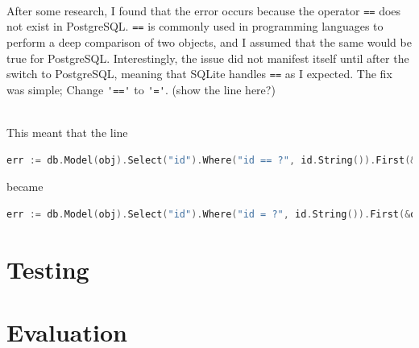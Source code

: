 \documentclass{article}
\begin{document}
\noindent \\ After some research, I found that the error occurs because the operator \lstinline{==} does not exist in PostgreSQL. \lstinline{==} is commonly used in programming languages to perform a deep comparison of two objects, and I assumed that the same would be true for PostgreSQL.
Interestingly, the issue did not manifest itself until after the switch to PostgreSQL, meaning that SQLite handles \lstinline{==} as I expected.
The fix was simple; Change \lstinline{'=='} to \lstinline{'='}. (show the line here?)

\noindent \\ This meant that the line

\begin{lstlisting}[language=Go]
    err := db.Model(obj).Select("id").Where("id == ?", id.String()).First(&obj).Error
\end{lstlisting}

\noindent became

\begin{lstlisting}[language=Go]
    err := db.Model(obj).Select("id").Where("id = ?", id.String()).First(&obj).Error
\end{lstlisting}

\pagebreak

\section{Testing}

\section{Evaluation}
\end{document}

